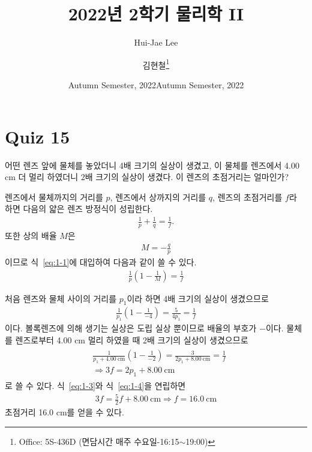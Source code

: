 \documentclass[tightenlines,floatfix,nofootinbib,superscriptaddress,fleqn]{revtex4}
\begin{document}
\title{\Large 2022년 2학기 물리학 II}
\author{Hui-Jae Lee} 
\date{Autumn Semester, 2022}
\author{김현철\footnote{Office: 5S-436D (면담시간 매주
    수요일-16:15$\sim$19:00)}} 
\date{Autumn Semester, 2022}
\maketitle


\section*{\large Quiz 15}
어떤 렌즈 앞에 물체를 놓았더니 4배 크기의 실상이 생겼고, 이 물체를
렌즈에서 4.00 cm 더 멀리 하였더니 2배 크기의 실상이 생겼다. 이 렌즈의
초점거리는 얼마인가? 

렌즈에서 물체까지의 거리를 $p$, 렌즈에서 상까지의 거리를 $q$, 렌즈의 초점거리를
$f$라 하면 다음의 얇은 렌즈 방정식이 성립한다.
\begin{align}\label{eq:1-1}
  \frac{1}{p}+\frac{1}{q}=\frac{1}{f}.
\end{align}
또한 상의 배율 $M$은
\begin{align}
  M = -\frac{q}{p}
\end{align}
이므로 식~\eqref{eq:1-1}에 대입하여 다음과 같이 쓸 수 있다.
\begin{align}
  \frac{1}{p}\left(1-\frac{1}{M}\right)=\frac{1}{f}
\end{align}

처음 렌즈와 물체 사이의 거리를 $p_1$이라 하면 4배 크기의 실상이 생겼으므로
\begin{align}\label{eq:1-3}
  \frac{1}{p_1}\left(1-\frac{1}{-4}\right)
  =\frac{5}{4p_1}=\frac{1}{f}
\end{align}
이다. 볼록렌즈에 의해 생기는 실상은 도립 실상 뿐이므로 배율의 부호가 $-$이다. 
물체를 렌즈로부터 4.00 cm 멀리 하였을 때 2배 크기의 실상이 생겼으므로
\begin{align}\label{eq:1-4}
  \begin{split}
    &\frac{1}{p_1+4.00~\mathrm{cm}}\left(1-\frac{1}{-2}\right)
    =\frac{3}{2p_1+8.00~\mathrm{cm}}=\frac{1}{f} \\
    &\Longrightarrow 3f= 2p_1+8.00~\mathrm{cm}
  \end{split}
\end{align}
로 쓸 수 있다. 식~\eqref{eq:1-3}와 식~\eqref{eq:1-4}을 연립하면
\begin{align}
  3f= \frac{5}{2}f+8.00~\mathrm{cm}
  \Longrightarrow
  f= 16.0~\mathrm{cm}
\end{align}
초점거리 16.0 cm를 얻을 수 있다.
\vspace{1cm}
\end{document}
